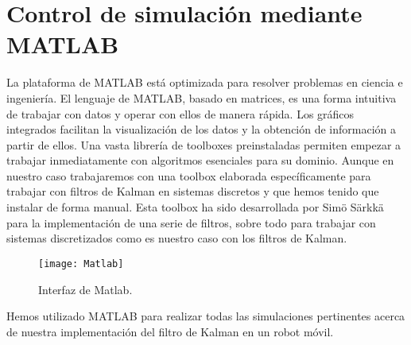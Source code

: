 \section{Control de simulación mediante MATLAB}
%
%
%
La plataforma de MATLAB está optimizada para resolver problemas en ciencia e ingeniería. El lenguaje de MATLAB, basado en matrices, es una forma intuitiva de trabajar con datos y operar con ellos de manera rápida. Los gráficos integrados facilitan la visualización de los datos y la obtención de información a partir de ellos. Una vasta librería de toolboxes preinstaladas permiten empezar a trabajar inmediatamente con algoritmos esenciales para su dominio. Aunque en nuestro caso trabajaremos con una toolbox elaborada específicamente para trabajar con filtros de Kalman en sistemas discretos\cite{toolbox_simo} y que hemos tenido que instalar de forma manual.
Esta toolbox ha sido desarrollada por Simö Särkkä para la implementación de una serie de filtros, sobre todo para trabajar con sistemas discretizados como es nuestro caso con los filtros de Kalman.
%
%
%
%
%
%
%
%
%
\begin{figure}[ht!]
\centering
\texttt{[image: Matlab]}
\caption{Interfaz de Matlab.} \label{Matlab}
\end{figure}
Hemos utilizado MATLAB para realizar todas las simulaciones pertinentes acerca de nuestra implementación del filtro de Kalman en un robot móvil.
%
%
